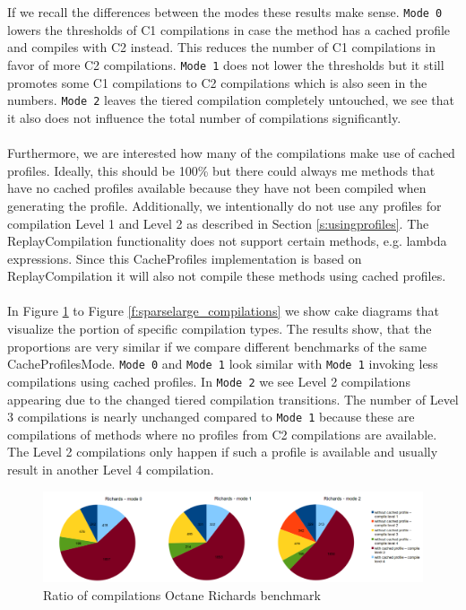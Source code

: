 \\\\
If we recall the differences between the modes these results make sense. \texttt{Mode 0} lowers the thresholds of C1 compilations in case the method has a cached profile and compiles with C2 instead. This reduces the number of C1 compilations in favor of more C2 compilations. \texttt{Mode 1} does not lower the thresholds but it still promotes some C1 compilations to C2 compilations which is also seen in the numbers.
\texttt{Mode 2} leaves the tiered compilation completely untouched, we see that it also does not influence the total number of compilations significantly.
\\\\
Furthermore, we are interested how many of the compilations make use of cached profiles. Ideally, this should be 100\% but there could always me methods that have no cached profiles available because they have not been compiled when generating the profile.
Additionally, we intentionally do not use any profiles for compilation Level 1 and Level 2 as described in Section \ref{s:usingprofiles}.
The ReplayCompilation functionality does not support certain methods, e.g. lambda expressions. Since this CacheProfiles implementation is based on ReplayCompilation it will also not compile these methods using cached profiles. 
\\\\
In Figure \ref{f:richards_compilations} to Figure \ref{f:sparselarge_compilations} we show cake diagrams that visualize the portion of specific compilation types.
The results show, that the proportions are very similar if we compare different benchmarks of the same CacheProfilesMode.
\texttt{Mode 0} and \texttt{Mode 1} look similar with \texttt{Mode 1} invoking less compilations using cached profiles. 
In \texttt{Mode 2} we see Level 2 compilations appearing due to the changed tiered compilation transitions. The number of Level 3 compilations is nearly unchanged compared to \texttt{Mode 1} because these are compilations of methods where no profiles from C2 compilations are available.
The Level 2 compilations only happen if such a profile is available and usually result in another Level 4 compilation. 
\begin{figure}[ht]
  \begin{center}
    \centering
    \includegraphics[width=1.0\textwidth]{figures/richards_compilations.png}
    \caption{Ratio of compilations Octane Richards benchmark}
    \label{f:richards_compilations}
  \end{center}
\end{figure}
